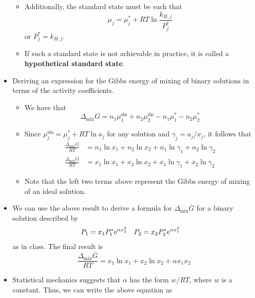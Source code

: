 \documentclass[../notes.tex]{subfiles}
\begin{document}
\begin{itemize}
\begin{itemize}
        \item Additionally, the standard state must be such that
        \begin{equation*}
            \mu_j = \mu_j^*+RT\ln\frac{k_{H,j}}{P_j^*}
        \end{equation*}
        or $P_j^*=k_{H,j}$.
        \item If such a standard state is not achievable in practice, it is called a \textbf{hypothetical standard state}.
    \end{itemize}
    \item Deriving an expression for the Gibbs energy of mixing of binary solutions in terms of the activity coefficients.
    \begin{itemize}
        \item We have that
        \begin{equation*}
            \Delta_\text{mix}G = n_1\mu_1^\text{sln}+n_2\mu_2^\text{sln}-n_1\mu_1^*-n_2\mu_2^*
        \end{equation*}
        \item Since $\mu_j^\text{sln}=\mu_j^*+RT\ln a_j$ for any solution and $\gamma_j=a_j/x_j$, it follows that
        \begin{align*}
            \frac{\Delta_\text{mix}G}{RT} &= n_1\ln x_1+n_2\ln x_2+n_1\ln\gamma_1+n_2\ln\gamma_2\\
            \frac{\Delta_\text{mix}\overline{G}}{RT} &= x_1\ln x_1+x_2\ln x_2+x_1\ln\gamma_1+x_2\ln\gamma_2
        \end{align*}
        \item Note that the left two terms above represent the Gibbs energy of mixing of an ideal solution.
    \end{itemize}
    \item We can use the above result to derive a formula for $\Delta_\text{mix}\overline{G}$ for a binary solution described by
    \begin{align*}
        P_1 &= x_1P_1^*\e[\alpha x_2^2]&
        P_2 &= x_2P_2^*\e[\alpha x_1^2]
    \end{align*}
    as in class. The final result is
    \begin{equation*}
        \frac{\Delta_\text{mix}\overline{G}}{RT} = x_1\ln x_1+x_2\ln x_2+\alpha x_1x_2
    \end{equation*}
    \item Statistical mechanics suggests that $\alpha$ has the form $w/RT$, where $w$ is a constant. Thus, we can write the above equation as
    \begin{equation*}

\end{equation*}
\end{itemize}
\end{document}

